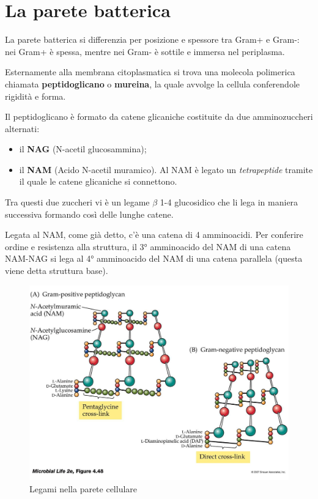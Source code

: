 \documentclass[11pt]{book}
\begin{document}
\section{La parete batterica}

La parete batterica si differenzia per posizione e spessore tra Gram+ e Gram-: nei Gram+ è spessa, mentre nei Gram- è sottile e immersa nel periplasma.

Esternamente alla membrana citoplasmatica si trova una molecola polimerica chiamata \textbf{peptidoglicano} o \textbf{mureina}, la quale avvolge la cellula conferendole rigidità e forma.

Il peptidoglicano è formato da catene glicaniche costituite da due amminozuccheri alternati:
\begin{itemize}
\item il \textbf{NAG} (N-acetil glucosammina);
\item il \textbf{NAM} (Acido N-acetil muramico). Al NAM è legato un \emph{tetrapeptide} tramite il quale le catene glicaniche si connettono.
\end{itemize}

Tra questi due zuccheri vi è un legame $\beta$ 1-4 glucosidico che li lega in maniera successiva formando così delle lunghe catene.

\vspace{1em}
Legata al NAM, come già detto, c’è una catena di 4 amminoacidi. Per conferire ordine e resistenza alla struttura, il 3° amminoacido del NAM di una catena NAM-NAG si lega al 4° amminoacido del NAM di una catena parallela (questa viene detta struttura base).

\begin{figure}[htp]
\centering
\includegraphics[scale=0.25]{img/NAM_NAG.jpg}
\caption{Legami nella parete cellulare}
\label{Legami parete cellulare}
\end{figure}
\end{document}
